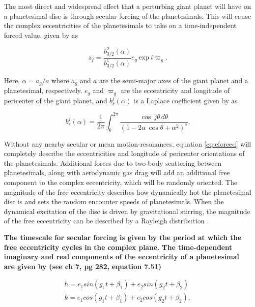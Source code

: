 \documentclass[fleqn,usenatbib]{mnras}
\begin{document}
The most direct and widespread effect that a perturbing giant planet will have on a planetesimal disc is through secular forcing of the planetesimals. This will 
cause the complex eccentricities of the planetesimals to take on a time-independent 
forced value, given by \citep{1999ApJ...527..918W} as

\begin{equation}\label{eq:eforced}
	z_{f} = \frac{b^{2}_{3/2} (\alpha)}{b^{1}_{3/2} (\alpha)} e_{g} ~ \mathrm{exp} ~ i \varpi_{g}.
\end{equation}

\noindent Here, $\alpha = a_{g} / a$ where $a_{g}$ and $a$ are the semi-major axes of the giant planet and a planetesimal, 
respectively. $e_{g}$ and $\varpi_{g}$ are the eccentricity and
longitude of pericenter of the giant planet, and $b^{j}_{s} (\alpha)$ is a 
Laplace coefficient given by \citep{1999ssd..book.....M} as

\begin{equation}\label{eq:lap}
	b_{s}^{j}(\alpha) = \frac{1}{2 \pi} \int_{0}^{2 \pi} \frac{\cos \, j \theta \, d \theta}{\left( 1 - 2 \alpha \, \cos \theta + \alpha^2 \right)^{s}}.
\end{equation}

Without any nearby secular or mean motion-resonances, equation \ref{eq:eforced} will completely describe the eccentricities and longitude of  
pericenter orientations of the planetesimals. Additional forces due to two-body scattering between planetesimals, along with 
aerodynamic gas drag will add an additional free component to the complex eccentricity, which will be randomly oriented. The 
magnitude of the free eccentricity describes how dynamically hot the planetesimal disc is and sets the random encounter speeds of 
planetesimals. When the dynamical excitation of the disc is driven by gravitational stirring, the magnitude of the free eccentricity can 
be described by a Rayleigh distribution \citep{1992Icar...96..107I}.

\textbf{The timescale for secular forcing is given by the period at which the free eccentricity cycles in the complex plane. The time-dependent imaginary and real components of the eccentricity of a planetesimal are given by \citet{1999ssd..book.....M} (see ch 7, pg 282, equation 7.51)}

\begin{eqnarray}\label{eq:kandh}
	h = e_{1} sin (g_{1} t + \beta_{1}) + e_{2} sin (g_{2} t + \beta_{2}) \\ \nonumber
	k = e_{1} cos (g_{1} t + \beta_{1}) + e_{2} cos (g_{2} t + \beta_{2}),
\end{eqnarray}
\end{document}
